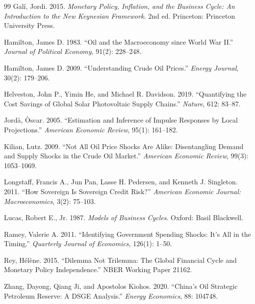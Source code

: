 \documentclass[12pt,a4paper]{article}
\begin{document}
\begin{thebibliography}{99}
Gal\'{i}, Jordi. 2015. \textit{Monetary Policy, Inflation, and the Business Cycle: An Introduction to the New Keynesian Framework}. 2nd ed. Princeton: Princeton University Press.

Hamilton, James D. 1983. ``Oil and the Macroeconomy since World War II.'' \textit{Journal of Political Economy}, 91(2): 228--248.

Hamilton, James D. 2009. ``Understanding Crude Oil Prices.'' \textit{Energy Journal}, 30(2): 179--206.

Helveston, John P., Yimin He, and Michael R. Davidson. 2019. ``Quantifying the Cost Savings of Global Solar Photovoltaic Supply Chains.'' \textit{Nature}, 612: 83--87.

Jord\`{a}, \`{O}scar. 2005. ``Estimation and Inference of Impulse Responses by Local Projections.'' \textit{American Economic Review}, 95(1): 161--182.

Kilian, Lutz. 2009. ``Not All Oil Price Shocks Are Alike: Disentangling Demand and Supply Shocks in the Crude Oil Market.'' \textit{American Economic Review}, 99(3): 1053--1069.

Longstaff, Francis A., Jun Pan, Lasse H. Pedersen, and Kenneth J. Singleton. 2011. ``How Sovereign Is Sovereign Credit Risk?'' \textit{American Economic Journal: Macroeconomics}, 3(2): 75--103.

Lucas, Robert E., Jr. 1987. \textit{Models of Business Cycles}. Oxford: Basil Blackwell.

Ramey, Valerie A. 2011. ``Identifying Government Spending Shocks: It's All in the Timing.'' \textit{Quarterly Journal of Economics}, 126(1): 1--50.

Rey, H\'{e}l\`{e}ne. 2015. ``Dilemma Not Trilemma: The Global Financial Cycle and Monetary Policy Independence.'' NBER Working Paper 21162.

Zhang, Dayong, Qiang Ji, and Apostolos Kiohos. 2020. ``China's Oil Strategic Petroleum Reserve: A DSGE Analysis.'' \textit{Energy Economics}, 88: 104748.

\end{thebibliography}
\end{document}
